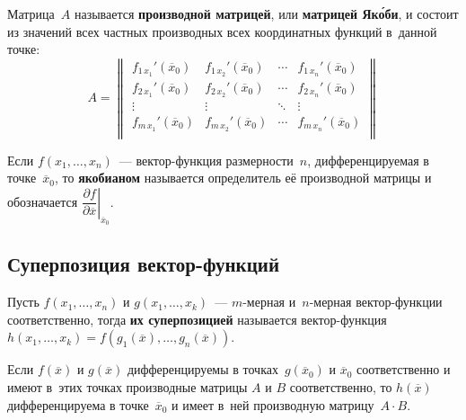   Матрица~$A$ называется \textbf{производной матрицей}, или \textbf{матрицей Як\'{о}би}, и состоит из значений всех частных производных всех координатных функций в~данной точке:
\begin{equation*}
A =
\begin{Vmatrix}
f_{1\, x_1}'(\overline x_0) & f_{1\, x_2}'(\overline x_0) & \cdots & f_{1\, x_n}'(\overline x_0) \\
f_{2\, x_1}'(\overline x_0) & f_{2\, x_2}'(\overline x_0) & \cdots & f_{2\, x_n}'(\overline x_0) \\
\vdots & \vdots & \ddots & \vdots \\
f_{m\, x_1}'(\overline x_0) & f_{m\, x_2}'(\overline x_0) & \cdots & f_{m\, x_n}'(\overline x_0) \\
\end{Vmatrix}
\end{equation*}

 Если $f(x_1, \ldots, x_n)$~--- вектор-функция размерности~$n$, дифференцируемая в точке~$\overline x_0$, то \textbf{якобианом} называется определитель её производной матрицы и обозначается $\left. \dfrac{\partial f}{\partial \overline x} \right|_{\overline x_0}$.

\subsection{Суперпозиция вектор-функций}
Пусть $f(x_1, \ldots, x_n)$ и $g(x_1, \ldots, x_k)$~--- $m$-мерная и~$n$-мерная вектор-функции соответственно, тогда \textbf{их суперпозицией} называется вектор-функция~$h(x_1, \ldots, x_k) = f(g_1(\overline x), \ldots, g_n(\overline x))$.

\begin{theorem}
Если $f(\overline x)$ и $g(\overline x)$ дифференцируемы в точках~$g(\overline x_0)$ и $\overline x_0$ соответственно и имеют в~этих точках производные матрицы $A$ и $B$ соответственно, то $h(\overline x)$ дифференцируема в точке~$\overline x_0$ и имеет в~ней производную матрицу~$A \cdot B$.
\end{theorem}